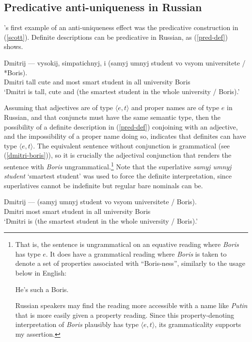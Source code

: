 \documentclass{article}
\begin{document}
\subsection{Predicative anti-uniqueness in Russian}
\citeauthor{cb2015}'s first example of an anti-uniqueness effect was the predicative construction in (\ref{scott}). Definite descriptions can be predicative in Russian, as (\ref{pred-def}) shows.

\begin{exe}
	\ex \label{pred-def} \gll Dmitrij --- vysokij, simpatichnyj, i (samyj umnyj student vo vsyom universitete / *Boris).\\
	Dmitri {} tall cute and most smart student in all university {} Boris\\
	\glt `Dmitri is tall, cute and (the smartest student in the whole university / Boris).'
\end{exe}

Assuming that adjectives are of type $\langle e, t \rangle$ and proper names are of type $e$ in Russian, and that conjuncts must have the same semantic type, then the possibility of a definite description in (\ref{pred-def}) conjoining with an adjective, and the impossibility of a proper name doing so, indicates that definites can have type $\langle e, t \rangle$. The equivalent sentence without conjunction is grammatical (see (\ref{dmitri-boris})), so it is crucially the adjectival conjunction that renders the sentence with \textit{Boris} ungrammatical.\footnote{That is, the sentence is ungrammatical on an equative reading where \textit{Boris} has type $e$. It does have a grammatical reading where \textit{Boris} is taken to denote a set of properties associated with ``Boris-ness'', similarly to the usage below in English: \begin{exe} \ex He's such a Boris.\end{exe} Russian speakers may find the reading more accessible with a name like \textit{Putin} that is more easily given a property reading. Since this property-denoting interpretation of \textit{Boris} plausibly has type $\langle e, t \rangle$, its grammaticality supports my assertion.} Note that the superlative \textit{samyj umnyj student} `smartest student' was used to force the definite interpretation, since superlatives cannot be indefinite but regular bare nominals can be.

\begin{exe}
	\ex \label{dmitri-boris} \gll Dmitrij --- (samyj umnyj student vo vsyom universitete / Boris).\\
	Dmitri {} most smart student in all university {} Boris\\
	\glt `Dmitri is (the smartest student in the whole university / Boris).'
\end{exe}
\end{document}
